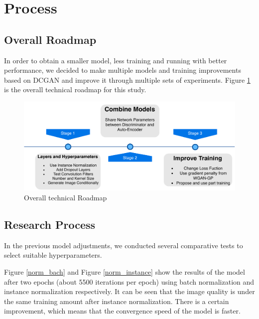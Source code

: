 \section{Process}
\subsection{Overall Roadmap}

In order to obtain a smaller model, less training and running with better performance,
we decided to make multiple models and training improvements based on DCGAN and improve it through multiple sets of experiments.
Figure \ref{roadmap} is the overall technical roadmap for this study.

\begin{figure}
    \begin{center}
    \includegraphics[width=\textwidth]{figures/roadmap.pdf}
    \caption{Overall technical Roadmap}
    \label{roadmap}
    \end{center}
\end{figure}


\subsection{Research Process}

In the previous model adjustments, we conducted several comparative tests to select suitable hyperparameters.

Figure \ref{norm_bach} and Figure \ref{norm_instance} show the results of the model after two epochs (about 5500 iterations per epoch) using batch normalization and instance normalization respectively.
It can be seen that the image quality is under the same training amount after instance normalization.
There is a certain improvement, which means that the convergence speed of the model is faster.

